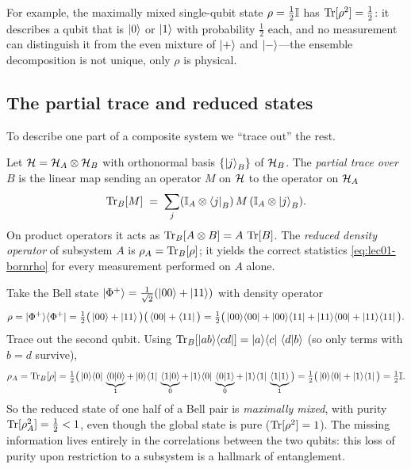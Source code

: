 For example, the maximally mixed single-qubit state $\rho=\tfrac12\mathbb{I}$ has
$\operatorname{Tr}[\rho^{2}]=\tfrac12$: it describes a qubit that is $\ket{0}$ or $\ket{1}$ with
probability $\tfrac12$ each, and no measurement can distinguish it from the even
mixture of $\ket{+}$ and $\ket{-}$---the ensemble decomposition is not unique, only
$\rho$ is physical.

\subsection{The partial trace and reduced states}

To describe one part of a composite system we ``trace out'' the rest.

\begin{definition}\label{def:lec01-ptrace}
Let $\mathcal{H}=\mathcal{H}_A\otimes\mathcal{H}_B$ with orthonormal basis $\{\ket{j}_B\}$ of
$\mathcal{H}_B$. The \emph{partial trace over $B$} is the linear map sending an operator
$M$ on $\mathcal{H}$ to the operator on $\mathcal{H}_A$
\begin{equation}
  \operatorname{Tr}_B[M]\;=\;\sum_j (\mathbb{I}_A\otimes\bra{j}_B)\,M\,(\mathbb{I}_A\otimes\ket{j}_B).
\end{equation}
On product operators it acts as $\operatorname{Tr}_B[A\otimes B]=A\,\operatorname{Tr}[B]$. The \emph{reduced
density operator} of subsystem $A$ is $\rho_A=\operatorname{Tr}_B[\rho]$; it yields the correct
statistics \eqref{eq:lec01-bornrho} for every measurement performed on $A$ alone.
\end{definition}

\begin{example}\label{ex:lec01-bellreduced}
Take the Bell state $\ket{\Phi^{+}}=\tfrac{1}{\sqrt2}(\ket{00}+\ket{11})$ with density
operator
\[
  \rho=\ket{\Phi^{+}}\!\bra{\Phi^{+}}
   =\tfrac12\big(\ket{00}+\ket{11}\big)\big(\bra{00}+\bra{11}\big)
   =\tfrac12\big(\ket{00}\!\bra{00}+\ket{00}\!\bra{11}+\ket{11}\!\bra{00}+\ket{11}\!\bra{11}\big).
\]
Trace out the second qubit. Using
$\operatorname{Tr}_B[\ket{ab}\!\bra{cd}]=\ket{a}\!\bra{c}\,\braket{d|b}$ (so only terms with $b=d$
survive),
\[
  \rho_A=\operatorname{Tr}_B[\rho]
   =\tfrac12\big(\ket{0}\!\bra{0}\,\underbrace{\braket{0|0}}_{1}+\ket{0}\!\bra{1}\,\underbrace{\braket{1|0}}_{0}
   +\ket{1}\!\bra{0}\,\underbrace{\braket{0|1}}_{0}+\ket{1}\!\bra{1}\,\underbrace{\braket{1|1}}_{1}\big)
   =\tfrac12\big(\ket{0}\!\bra{0}+\ket{1}\!\bra{1}\big)=\tfrac12\mathbb{I}.
\]
So the reduced state of one half of a Bell pair is \emph{maximally mixed}, with
purity $\operatorname{Tr}[\rho_A^{2}]=\tfrac12<1$, even though the global state is pure
($\operatorname{Tr}[\rho^{2}]=1$). The missing information lives entirely in the correlations
between the two qubits: this loss of purity upon restriction to a subsystem is a
hallmark of entanglement.
\end{example}

